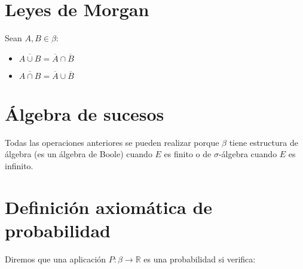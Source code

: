 \documentclass[12pt,a4paper,oneside,onecolumn,titlepage]{book}
\begin{document}
\section{Leyes de Morgan}
Sean $A, B \in \beta$:
\begin{itemize}
\item $\overline{A \cup B} = \overline{A} \cap \overline{B}$
\item $\overline{A \cap B} = \overline{A} \cup \overline{B}$
\end{itemize}


\section{Álgebra de sucesos}
Todas las operaciones anteriores se pueden realizar porque $\beta$ tiene estructura de álgebra (es un álgebra de Boole) cuando $E$ es finito o de $\sigma$-álgebra cuando $E$ es infinito.


\section{Definición axiomática de probabilidad}
Diremos que una aplicación $P: \beta \rightarrow \mathbb{R}$ es una probabilidad si verifica:
\end{document}
